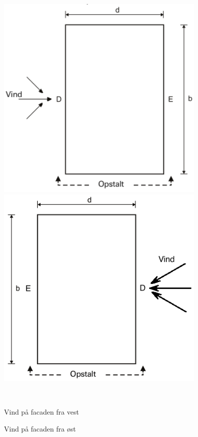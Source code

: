 \begin{figure}[htbp]\centering
	\begin{minipage}[b]{0.48\textwidth}\centering
		\includegraphics[width=0.9\textwidth]{billeder/vindvest1.png} %
	\end{minipage}\hfill
	\begin{minipage}[b]{0.48\textwidth}\centering
		\includegraphics[width=0.9\textwidth]{billeder/vindost1.png} %
	\end{minipage}\\ %
	\begin{minipage}[t]{0.48\textwidth}
		\caption{Vind på facaden fra vest \citep[ 7.2.2]{EU91}} %
		\label{fig:vindvest}
	\end{minipage}\hfill
	\begin{minipage}[t]{0.48\textwidth}
		\caption{Vind på facaden fra øst \citep[ 7.2.2]{EU91}} %
		\label{fig:vindost}
	\end{minipage}
\end{figure}


